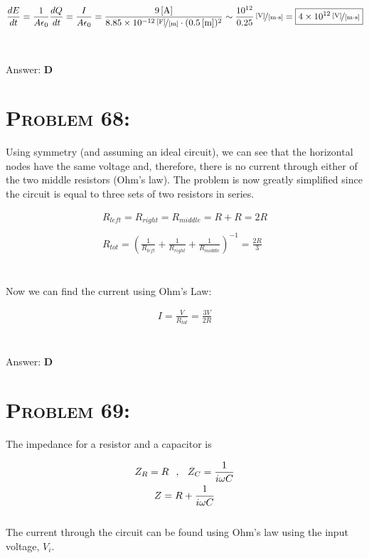 \documentclass{article}
\providecommand{\e}[1]{\ensuremath{\times 10^{#1}}}
\begin{document}
\begin{align}
\frac{d E}{d t} = \frac{1}{A \epsilon_{0}} \frac{d Q}{d t} = \frac{I}{A \epsilon_{0}} = \frac{\unit[9]{[A]}}{\unitfrac[8.85\e{-12}]{[F]}{[m]} \cdot (\unit[0.5]{[m]})^{2}} \sim \unitfrac[\frac{10^{12}}{0.25}]{[V]}{[m \cdot s]} = \boxed{\unitfrac[4\e{12}]{[V]}{[m \cdot s]}}\nonumber
\end{align}
\\\\
Answer: \textbf{\textcolor{ProcessBlue}D}\\


\section{\textsc{Problem 68:}} Using symmetry (and assuming an ideal circuit), we can see that the  horizontal nodes have the same voltage and, therefore, there is no current through either of the two middle resistors (Ohm's law). The problem is now greatly simplified since the circuit is equal to three sets of two resistors in series.

\begin{gather}
R_{left} = R_{right} = R_{middle} = R + R = 2R\nonumber\\
\nonumber\\
R_{tot} = \left( \frac{1}{R_{left}} + \frac{1}{R_{right}} + \frac{1}{R_{middle}} \right)^{-1} = \frac{2R}{3}\nonumber
\end{gather}
\\\\
Now we can find the current using Ohm's Law:

\begin{align}
I = \frac{V}{R_{tot}} = \boxed{\frac{3V}{2R}}\nonumber
\end{align}
\\\\
Answer: \textbf{\textcolor{ProcessBlue}D}\\


\section{\textsc{Problem 69:}} The impedance for a resistor and a capacitor is

\begin{gather}
Z_{R} = R \hspace{.1 in}, \hspace{.1 in} Z_{C} = \frac{1}{i \omega C}\\
Z = R + \frac{1}{i \omega C}\nonumber
\end{gather}
\\
The current through the circuit can be found using Ohm's law using the input voltage, $V_{i}$.
\end{document}
